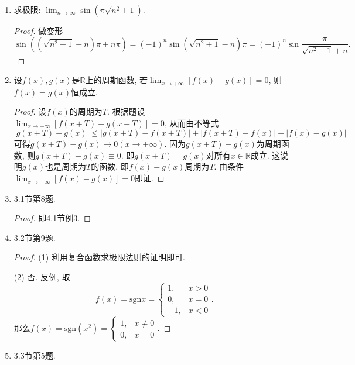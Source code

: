 \documentclass[UTF8,11pt, a4paper, oneside, fontset=none]{ctexbook}
\begin{document}
\begin{enumerate}
\begin{proof}
\end{proof}


\item 求极限: $\lim_{n \to \infty} \sin(\pi \sqrt{n^2+1})$.

\begin{proof}
做变形
\[
\sin((\sqrt{n^2+1} -n)\pi + n \pi )= (-1)^n \sin (\sqrt{n^2+1} -n)\pi = (-1)^n \sin \frac{\pi}{\sqrt{n^2+1} +n}.
\]

\end{proof}

\item 设$f(x), g(x)$是$\mathbb R$上的周期函数, 若$\lim_{x \to +\infty}[f(x) -g(x)] =0$, 则$f(x) = g(x)$恒成立.

\begin{proof}
设$f(x)$的周期为$T$. 根据题设$\lim_{x \to +\infty}[f(x+T) -g(x+T)] =0$, 从而由不等式
\[
|g(x+T) - g(x) | \leq |g(x+T) - f(x+T)| + |f(x+T) - f(x)| + |f(x) - g(x)|
\]
可得$g(x+T) - g(x) \to 0 ( x \to +\infty)$. 因为$g(x+T) - g(x)$为周期函数, 则$g(x+T) - g(x) \equiv 0$. 即$g(x+T) = g(x)$对所有$x \in \mathbb R$成立. 这说明$g(x)$也是周期为$T$的函数, 即$f(x) - g(x)$周期为$T$. 由条件$\lim_{x \to +\infty}[f(x) -g(x)] =0$即证.

\end{proof}


\item 3.1节第8题.


\begin{proof}

即4.1节例3.

\end{proof}

\item 3.2节第9题.


\begin{proof}

(1) 利用复合函数求极限法则的证明即可.

(2) 否. 反例, 取
\[
f(x) = \text{sgn} x = \begin{cases}
1, & x>0\\
0, & x=0\\
-1, & x<0
\end{cases}.
\]
那么$f(x) = \text{sgn}(x^2) = \begin{cases}
1, & x \neq 0\\
0, & x =0
\end{cases}$.


\end{proof}

\item 3.3节第5题.



\end{enumerate}
\end{document}

